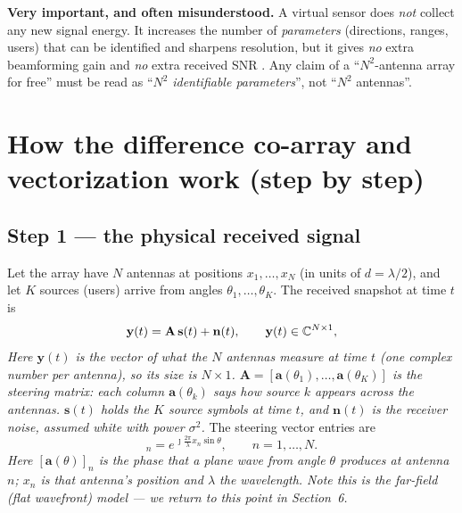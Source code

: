 \documentclass[11pt]{article}
\newcommand{\va}{\mathbf{a}}\newcommand{\vy}{\mathbf{y}}\newcommand{\vs}{\mathbf{s}}
\newcommand{\vn}{\mathbf{n}}\newcommand{\vz}{\mathbf{z}}\newcommand{\vp}{\mathbf{p}}
\newcommand{\mA}{\mathbf{A}}\newcommand{\mR}{\mathbf{R}}\newcommand{\mI}{\mathbf{I}}
\begin{document}
\begin{warnbox}
\textbf{Very important, and often misunderstood.} A virtual sensor does \emph{not} collect any new
signal energy. It increases the number of \emph{parameters} (directions, ranges, users) that can be
identified and sharpens resolution, but it gives \emph{no} extra beamforming gain and \emph{no} extra
received SNR \cite{pal2010nested,liu2015remarks}. Any claim of a ``$N^{2}$-antenna array for free''
must be read as ``$N^{2}$ \emph{identifiable parameters}'', not ``$N^{2}$ antennas''.
\end{warnbox}

\section{How the difference co-array and vectorization work (step by step)}

\subsection{Step 1 --- the physical received signal}
Let the array have $N$ antennas at positions $x_{1},\dots,x_{N}$ (in units of $d=\lambda/2$), and let
$K$ sources (users) arrive from angles $\theta_{1},\dots,\theta_{K}$. The received snapshot at time
$t$ is
\begin{equation}
\vy(t)=\mA\,\vs(t)+\vn(t),\qquad \vy(t)\in\C^{N\times1},
\label{eq:phys}
\end{equation}
\textit{Here $\vy(t)$ is the vector of what the $N$ antennas measure at time $t$ (one complex number
per antenna), so its size is $N\times1$. $\mA=[\va(\theta_{1}),\dots,\va(\theta_{K})]$ is the
steering matrix: each column $\va(\theta_{k})$ says how source $k$ appears across the antennas.
$\vs(t)$ holds the $K$ source symbols at time $t$, and $\vn(t)$ is the receiver noise, assumed white
with power $\sigma^{2}$.} The steering vector entries are
\begin{equation}
[\va(\theta)]_{n}=e^{\,\jmath\frac{2\pi}{\lambda}x_{n}\sin\theta},\qquad n=1,\dots,N .
\label{eq:steer}
\end{equation}
\textit{Here $[\va(\theta)]_{n}$ is the phase that a plane wave from angle $\theta$ produces at
antenna $n$; $x_{n}$ is that antenna's position and $\lambda$ the wavelength. Note this is the
\emph{far-field} (flat wavefront) model --- we return to this point in Section~6.}
\end{document}
